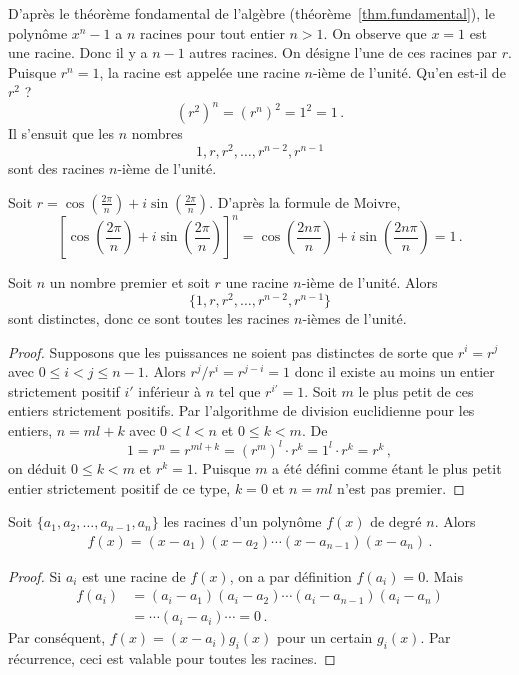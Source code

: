 D'après le théorème fondamental de l'algèbre (théorème~\ref{thm.fundamental}), le polynôme $x^{n}-1$ a $n$ racines pour tout entier $n> 1$. On observe que $x=1$ est une racine. Donc il y a $n-1$ autres racines. On désigne l'une de ces racines par $r$. Puisque $r^{n}=1$, la racine est appelée une racine $n$-ième de l'unité. Qu'en est-il de $r^2$ ?
\[
(r^{2})^n=(r^{n})^2=1^2=1\,.
\]
Il s'ensuit que les $n$ nombres 
\[
1, r, r^2, \ldots, r^{n-2}, r^{n-1}
\]
sont des racines $n$-ième de l'unité.

\begin{advanced}
Soit $r=\cos \left(\frac{2\pi}{n}\right) + i\sin  \left(\frac{2\pi}{n}\right)$.
D'après la formule de Moivre,
\[
\left[\cos \left(\frac{2\pi}{n}\right) + i\sin  \left(\frac{2\pi}{n}\right)\right]^{n}=
\cos \left(\frac{2 n\pi}{n}\right) + i\sin  \left(\frac{2 n\pi}{n}\right)= 1\,.
\]
\vspace{-2ex}
\end{advanced}



\begin{theorem}
Soit $n$ un nombre premier et soit $r$ une racine $n$-ième  de l'unité. Alors 
\[
\{1,r,r^2,\ldots,r^{n-2},r^{n-1}\}
\]
sont distinctes, donc ce sont toutes les racines $n$-ièmes  de l'unité.
\end{theorem}

\begin{proof}
Supposons que les puissances ne soient pas distinctes de sorte que $r^i=r^j$ avec $0\leq i<j\leq n-1$. Alors $r^j/r^i=r^{j-i}=1$ donc il existe au moins un entier strictement positif $i'$ inférieur à $n$ tel que $r^{i'}=1$. Soit $m$ le plus petit de ces entiers strictement  positifs. Par l'algorithme de division euclidienne pour les entiers,  $n=ml+k$ avec $0<l<n$ et $0\leq k<m$. De 
\[
1=r^n=r^{ml+k}=(r^m)^l\cdot r^k=1^l\cdot r^k=r^k\,,
\]
on déduit $0\leq k<m$ et $r^k=1$. Puisque $m$ a été défini comme étant le plus petit entier strictement positif de ce type, $k=0$ et $n=ml$ n'est pas premier.
\end{proof}

\begin{theorem} Soit $\{a_1,a_2,\ldots,a_{n-1},a_n\}$ les racines d'un polynôme $f(x)$ de degré $n$. Alors 
\begin{align}\label{eq.viete}
f(x) =(x-a_1) (x-a_2)\cdots (x-a_{n-1})(x-a_n)\,.
\end{align}
\end{theorem}

\begin{proof}
Si $a_i$ est une racine de $f(x)$, on a par définition $f(a_i)=0$. Mais 
\begin{align*}
f(a_i)&=(a_i-a_1) (a_i-a_2)\cdots (a_i-a_{n-1})(a_i-a_n)\\
&=\cdots (a_i-a_i) \cdots =0\,.
\end{align*}
Par conséquent, $f(x)=(x-a_i)g_i(x)$ pour un certain $g_i(x)$. Par récurrence, ceci est valable pour toutes les racines.
\end{proof}


